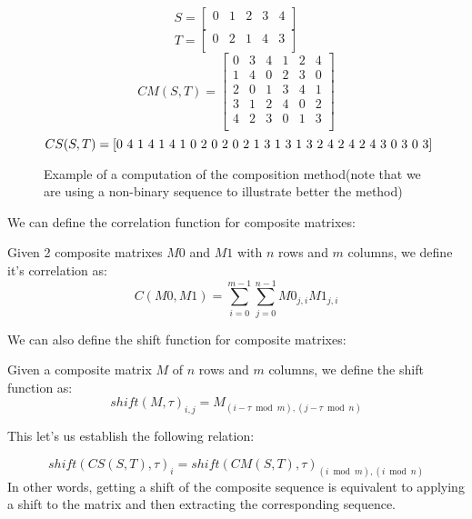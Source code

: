 \begin{figure}[ht!]
  $$S = \begin{bmatrix}
    0 & 1 & 2 & 3 & 4\\
  \end{bmatrix}$$
  $$T = \begin{bmatrix}
    0 & 2 & 1 & 4 & 3 \\
  \end{bmatrix}
  $$
  $$CM(S, T) = \begin{bmatrix}
  0 & 3 & 4 & 1 & 2 & 4\\
  1 & 4 & 0 & 2 & 3 & 0\\
  2 & 0 & 1 & 3 & 4 & 1\\
  3 & 1 & 2 & 4 & 0 & 2\\
  4 & 2 & 3 & 0 & 1 & 3\\
  \end{bmatrix}
  $$
  $$CS(S, T) = \text{[0 4 1 4 1 4 1 0 2 0 2 0 2 1 3 1 3 1 3 2 4 2 4 2 4 3 0 3 0 3]}\\
  $$
  \caption{Example of a computation of the composition method(note that we are
  using a non-binary sequence to illustrate better the method)}
  \label{}
\end{figure}

We can define the correlation function for composite matrixes:

\begin{definition}
  Given 2 composite matrixes $M0$ and $M1$ with $n$ rows and $m$ columns,
  we define it's correlation as:
  \begin{equation}
    C(M0, M1) = \sum_{i=0}^{m-1}\sum_{j=0}^{n-1}M0_{j, i}M1_{j,i}
  \end{equation}
\end{definition}

We can also define the shift function for composite matrixes:

\begin{definition}
  Given a composite matrix $M$ of $n$ rows and $m$ columns, we define the
  shift function as:
  \begin{equation}
    shift(M, \tau)_{i, j} = M_{(i-\tau \bmod m), (j-\tau \bmod n)}
  \end{equation}
\end{definition}
This let's us establish the following relation:
  \begin{corollary}
    \begin{equation}
      shift(CS(S, T), \tau)_{i} = shift(CM(S, T), \tau)_{(i \bmod m), (i \bmod n)}
    \end{equation}
  In other words, getting a shift of the composite sequence is equivalent to
  applying a shift to the matrix and then extracting the corresponding
  sequence.
  \end{corollary}


